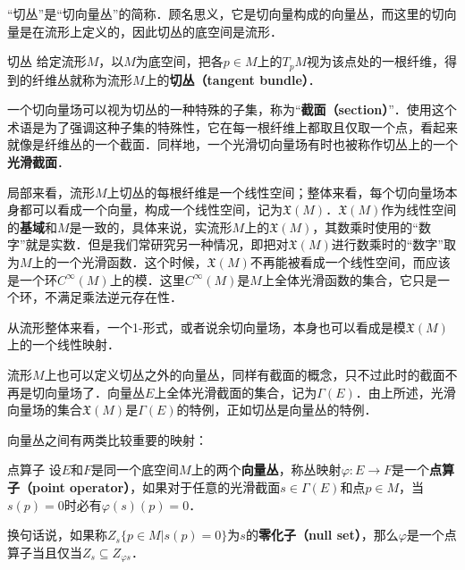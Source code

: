 \begin{issues}
\issueDraft
\end{issues}


“切丛”是“切向量丛”的简称．顾名思义，它是切向量构成的向量丛，而这里的切向量是在流形上定义的，因此切丛的底空间是流形．

\begin{definition}{切丛}
给定流形$M$，以$M$为底空间，把各$p\in M$上的$T_pM$视为该点处的一根纤维，得到的纤维丛就称为流形$M$上的\textbf{切丛（tangent bundle）}．
\end{definition}

一个切向量场可以视为切丛的一种特殊的子集，称为“\textbf{截面（section）}”．使用这个术语是为了强调这种子集的特殊性，它在每一根纤维上都取且仅取一个点，看起来就像是纤维丛的一个截面．同样地，一个光滑切向量场有时也被称作切丛上的一个\textbf{光滑截面}．

局部来看，流形$M$上切丛的每根纤维是一个线性空间；整体来看，每个切向量场本身都可以看成一个向量，构成一个线性空间，记为$\mathfrak{X}(M)$．$\mathfrak{X}(M)$作为线性空间的\textbf{基域}和$M$是一致的，具体来说，实流形$M$上的$\mathfrak{X}(M)$，其数乘时使用的“数字”就是实数．但是我们常研究另一种情况，即把对$\mathfrak{X}(M)$进行数乘时的“数字”取为$M$上的一个光滑函数．这个时候，$\mathfrak{X}(M)$不再能被看成一个线性空间，而应该是一个环$C^\infty(M)$上的模．这里$C^\infty(M)$是$M$上全体光滑函数的集合，它只是一个环，不满足乘法逆元存在性．

从流形整体来看，一个1-形式，或者说余切向量场，本身也可以看成是模$\mathfrak{X}(M)$上的一个线性映射．

流形$M$上也可以定义切丛之外的向量丛，同样有截面的概念，只不过此时的截面不再是切向量场了．向量丛$E$上全体光滑截面的集合，记为$\Gamma(E)$．由上所述，光滑向量场的集合$\mathfrak{X}(M)$是$\Gamma(E)$的特例，正如切丛是向量丛的特例．

向量丛之间有两类比较重要的映射：

\begin{definition}{点算子}
设$E$和$F$是同一个底空间$M$上的两个\textbf{向量丛}，称丛映射$\varphi:E\rightarrow F$是一个\textbf{点算子（point operator）}，如果对于任意的光滑截面$s\in\Gamma(E)$和点$p\in M$，当$s(p)=0$时必有$\varphi(s)(p)=0$．

换句话说，如果称$Z_s\{p\in M|s(p)=0\}$为$s$的\textbf{零化子（null set）}，那么$\varphi$是一个点算子当且仅当$Z_s\subseteq Z_{\varphi{s}}$．
\end{definition}

